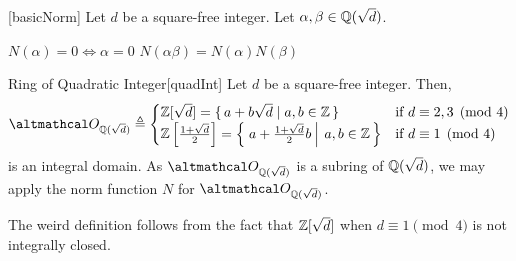\documentclass[../modern_algebra_2.tex]{subfiles}
\begin{document}
\begin{Theorem}{}[basicNorm]
    Let \(d\) be a square-free integer. Let \(\alpha, \beta \in \QQ(\sqrt{d})\).
    \begin{enumerate}[label=(\roman*), ref=\protect{\Cref{th:basicNorm} (\roman*)}]
        \ii\label{itm:basicNorm.i}
        \(N(\alpha) = 0 \iff \alpha = 0\)
        \ii\label{itm:basicNorm.ii}
        \(N(\alpha \beta) = N(\alpha)N(\beta)\)
    \end{enumerate}
\end{Theorem}

\begin{Definition}{Ring of Quadratic Integer}[quadInt]
    Let \(d\) be a square-free integer. Then,
    \[
        \rqi{\sqrt{d}} \triangleq \begin{cases}
            \ZZ{}[\sqrt{d}] = \{\,a+b\sqrt{d} \mid a, b \in \ZZ\,\} & \text{if}~d \equiv 2, 3 \pmod{4} \\
            \ZZ{} \left[\frac{1+\sqrt{d}}{2}\right] = \left\{\,\left. a+\frac{1+\sqrt{d}}{2}b\:\right\vert\: a, b \in \ZZ\,\right\} & \text{if}~d \equiv 1 \pmod{4}
        \end{cases}
    \]
    is an integral domain.
    As \(\rqi{\sqrt{d}}\) is a subring of \(\QQ(\sqrt{d})\),
    we may apply the norm function \(N\) for \(\rqi{\sqrt{d}}\).
\end{Definition}

\begin{note}
    The weird definition follows from the fact that
    \(\ZZ{}[\sqrt{d}]\) when \(d \equiv 1 \pmod{4}\) is not integrally closed.
\end{note}
\end{document}

